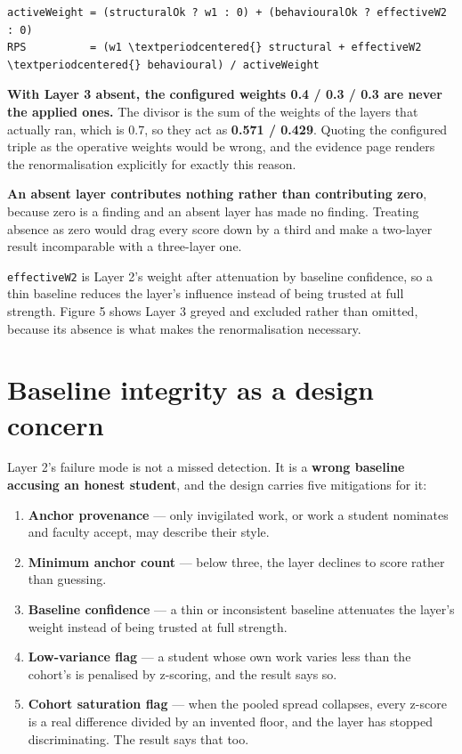 \begin{verbatim}
activeWeight = (structuralOk ? w1 : 0) + (behaviouralOk ? effectiveW2 : 0)
RPS          = (w1 \textperiodcentered{} structural + effectiveW2 \textperiodcentered{} behavioural) / activeWeight
\end{verbatim}

\textbf{With Layer 3 absent, the configured weights 0.4 / 0.3 / 0.3 are
never the applied ones.} The divisor is the sum of the weights of the
layers that actually ran, which is 0.7, so they act as \textbf{0.571 /
0.429}. Quoting the configured triple as the operative weights would be
wrong, and the evidence page renders the renormalisation explicitly for
exactly this reason.

\textbf{An absent layer contributes nothing rather than contributing
zero}, because zero is a finding and an absent layer has made no
finding. Treating absence as zero would drag every score down by a third
and make a two-layer result incomparable with a three-layer one.

\texttt{effectiveW2} is Layer 2's weight after attenuation by baseline
confidence, so a thin baseline reduces the layer's influence instead of
being trusted at full strength. Figure 5 shows Layer 3 greyed and
excluded rather than omitted, because its absence is what makes the
renormalisation necessary.

\hypertarget{baseline-integrity-as-a-design-concern}{%
\section{Baseline integrity as a design
concern}\label{baseline-integrity-as-a-design-concern}}

Layer 2's failure mode is not a missed detection. It is a \textbf{wrong
baseline accusing an honest student}, and the design carries five
mitigations for it:

\begin{enumerate}
\def\labelenumi{\arabic{enumi}.}
\tightlist
\item
  \textbf{Anchor provenance} --- only invigilated work, or work a
  student nominates and faculty accept, may describe their style.
\item
  \textbf{Minimum anchor count} --- below three, the layer declines to
  score rather than guessing.
\item
  \textbf{Baseline confidence} --- a thin or inconsistent baseline
  attenuates the layer's weight instead of being trusted at full
  strength.
\item
  \textbf{Low-variance flag} --- a student whose own work varies less
  than the cohort's is penalised by z-scoring, and the result says so.
\item
  \textbf{Cohort saturation flag} --- when the pooled spread collapses,
  every z-score is a real difference divided by an invented floor, and
  the layer has stopped discriminating. The result says that too.
\end{enumerate}

